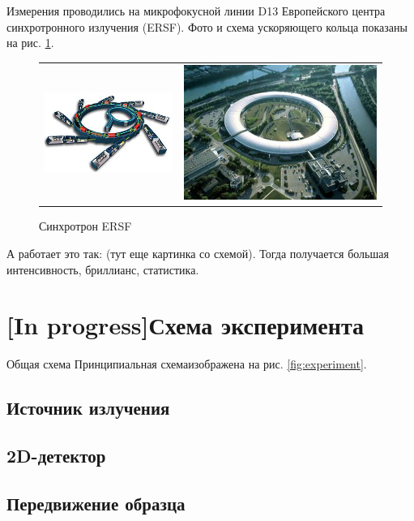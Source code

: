 Измерения проводились на микрофокусной линии D13 Европейского центра синхротронного излучения (ERSF). Фото и схема ускоряющего кольца показаны на рис. \ref{fig:ring}. 
	
	
		\begin{figure}[h]\center
\begin{tabular}{cc}
\includegraphics[width=0.5\linewidth]{fig/pribor-scheme.jpg}
&
\includegraphics[width=0.5\linewidth]{fig/pribor-photo.jpg}
\end{tabular}
\caption{Синхротрон ERSF}
\label{fig:ring}
\end{figure}
	
А работает это так:
(тут еще картинка со схемой). Тогда получается большая интенсивность, бриллианс, статистика.



\section{[In progress]Схема эксперимента}
Общая схема
Принципиальная схемаизображена на рис. \ref{fig:experiment}. 

\subsection{Источник излучения}


\subsection{2D-детектор}

\subsection{Передвижение образца}


